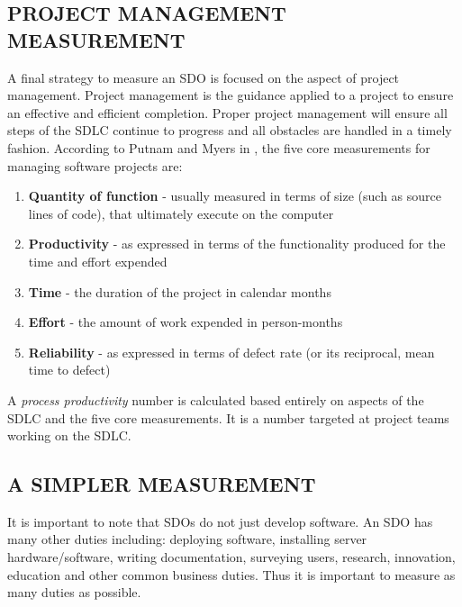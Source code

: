 \documentclass[SDSUThesis.tex]{subfiles}
\begin{document}
    \subsection{PROJECT MANAGEMENT MEASUREMENT}
    \label{sec:pm}
        A final strategy to measure an SDO is focused on the aspect of
        project management. Project management is the guidance
        applied to a project to ensure an effective and efficient
        completion.  Proper project management will ensure all steps
        of the SDLC
        continue to progress and all obstacles are handled
        in a timely fashion.  
        According to Putnam and Myers in \cite{Putnam2013}, 
        the five core measurements for managing software
        projects are:
        
        \begin{enumerate}
            \item \textbf{Quantity of function} - usually measured in terms of size (such as source lines of code), that ultimately execute on the computer
            \item \textbf{Productivity} - as expressed in terms of the functionality produced for the time and effort expended
            \item \textbf{Time} - the duration of the project in calendar months
            \item \textbf{Effort} - the amount of work expended in person-months
            \item \textbf{Reliability} - as expressed in terms of defect rate (or its reciprocal, mean time to defect)
        \end{enumerate}
        
        A \textit{process productivity} number is calculated based entirely
        on aspects of the SDLC and the five core measurements.  It is a number
        targeted at project teams working on the SDLC.  
       
    \subsection{A SIMPLER MEASUREMENT}
    
        It is important to note that SDOs do not just
        develop software.  An SDO has many other duties
        including: deploying software, installing server hardware/software,
        writing documentation, surveying users, research, innovation,
        education and other common business duties.  Thus it is
        important to measure as many duties as possible.  
    
\end{document}
